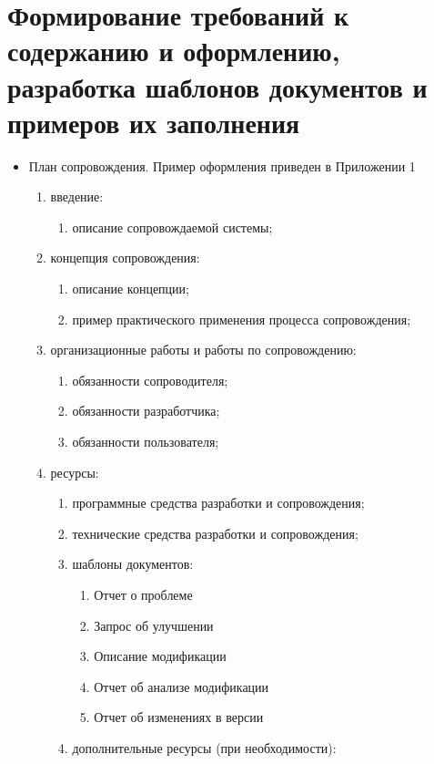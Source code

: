 
\pagebreak


\section{Формирование требований к содержанию и оформлению, разработка шаблонов документов и примеров их заполнения}

\begin{itemize}
    \item План сопровождения. Пример оформления приведен в Приложении 1
    \begin{enumerate}
        \item введение:
        \begin{enumerate}
            \item описание сопровождаемой системы;
        \end{enumerate}
        \item концепция сопровождения:
        \begin{enumerate}
            \item описание концепции;
            \item пример практического применения процесса сопровождения;
        \end{enumerate}

        \item организационные работы и работы по сопровождению:
        \begin{enumerate}
            \item обязанности сопроводителя;
            \item обязанности разработчика;
            \item обязанности пользователя;
        \end{enumerate}

        \item ресурсы:
        \begin{enumerate}
            \item программные средства разработки и сопровождения;
            \item технические средства разработки и сопровождения;
            \item шаблоны документов:
            \begin{enumerate}
                \item Отчет о проблеме
                \item Запрос об улучшении
                \item Описание модификации
                \item Отчет об анализе модификации
                \item Отчет об изменениях в версии
            \end{enumerate}
            \item дополнительные ресурсы (при необходимости):
        \end{enumerate}


\end{enumerate}
\end{itemize}
